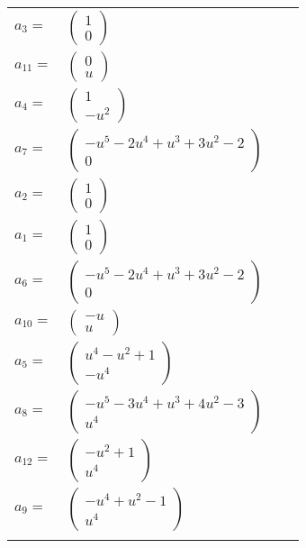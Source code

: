 \documentclass[1p]{elsarticle_modified}
\theoremstyle{definition}
\begin{document}
\begin{tabular}{m{7pt} m{180pt} m{7pt} m{180pt} }
\flushright $a_{3}=$&$\begin{pmatrix}1\\0\end{pmatrix}$ \\
\flushright $a_{11}=$&$\begin{pmatrix}0\\u\end{pmatrix}$ \\
\flushright $a_{4}=$&$\begin{pmatrix}1\\- u^2\end{pmatrix}$ \\
\flushright $a_{7}=$&$\begin{pmatrix}- u^5-2 u^4+u^3+3 u^2-2\\0\end{pmatrix}$ \\
\flushright $a_{2}=$&$\begin{pmatrix}1\\0\end{pmatrix}$ \\
\flushright $a_{1}=$&$\begin{pmatrix}1\\0\end{pmatrix}$ \\
\flushright $a_{6}=$&$\begin{pmatrix}- u^5-2 u^4+u^3+3 u^2-2\\0\end{pmatrix}$ \\
\flushright $a_{10}=$&$\begin{pmatrix}- u\\u\end{pmatrix}$ \\
\flushright $a_{5}=$&$\begin{pmatrix}u^4- u^2+1\\- u^4\end{pmatrix}$ \\
\flushright $a_{8}=$&$\begin{pmatrix}- u^5-3 u^4+u^3+4 u^2-3\\u^4\end{pmatrix}$ \\
\flushright $a_{12}=$&$\begin{pmatrix}- u^2+1\\u^4\end{pmatrix}$ \\
\flushright $a_{9}=$&$\begin{pmatrix}- u^4+u^2-1\\u^4\end{pmatrix}$\\&\end{tabular}
\end{document}
